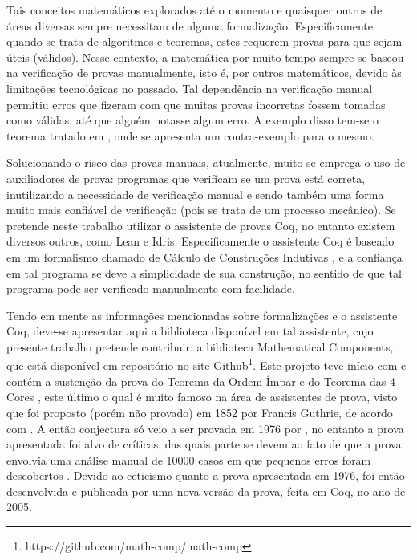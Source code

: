 Tais conceitos matemáticos explorados até o momento e quaisquer outros de áreas diversas sempre necessitam de alguma formalização. Especificamente quando se trata de algoritmos e teoremas, estes requerem provas para que sejam úteis (válidos). Nesse contexto, a matemática por muito tempo sempre se baseou na verificação de provas manualmente, isto é, por outros matemáticos, devido às limitações tecnológicas no passado. Tal dependência na verificação manual permitiu erros que fizeram com que muitas provas incorretas fossem tomadas como válidas, até que alguém notasse algum erro.  A exemplo disso tem-se o teorema tratado em \cite{Neeman2002}, onde se apresenta um contra-exemplo para o mesmo.

Solucionando o risco das provas manuais, atualmente, muito se emprega o uso de auxiliadores de prova: programas que verificam se um prova está correta, inutilizando a necessidade de verificação manual e sendo também uma forma muito mais confiável de verificação (pois se trata de um processo mecânico). Se pretende neste trabalho utilizar o assistente de provas Coq, no entanto existem diversos outros, como Lean e Idris. Especificamente o assistente Coq é baseado em um formalismo chamado de Cálculo de Construções Indutivas \cite{paulinmohring:hal-01094195}, e a confiança em tal programa se deve a simplicidade de sua construção, no sentido de que tal programa pode ser verificado manualmente com facilidade.

Tendo em mente as informações mencionadas sobre formalizações e o assistente Coq, deve-se apresentar aqui a biblioteca disponível em tal assistente, cujo presente trabalho pretende contribuir: a biblioteca Mathematical Components, que está disponível em repositório no site Github\footnote{https://github.com/math-comp/math-comp}. Este projeto teve início com e contém a sustenção da prova do Teorema da Ordem Ímpar e do Teorema das 4 Cores \cite{assia_mahboubi_2022_7118596}, este último o qual é muito famoso na área de assistentes de prova, visto que foi proposto (porém não provado) em 1852 por Francis Guthrie, de acordo com \cite{gonthier:hal-04034866}. A então conjectura só veio a ser provada em 1976 por \cite{bams/1183538218}, no entanto a prova apresentada foi alvo de críticas, das quais parte se devem ao fato de que a prova envolvia uma análise manual de 10000 casos em que pequenos erros foram descobertos \cite{gonthier:hal-04034866}. Devido ao ceticismo quanto a prova apresentada em 1976, foi então desenvolvida e publicada por \cite{gonthier:hal-04034866} uma nova versão da prova, feita em Coq, no ano de 2005.


